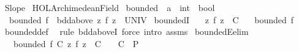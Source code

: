 %
\begin{isabellebody}%
%
%
\isadelimtheory
\isanewline
\isanewline
%
\endisadelimtheory
%
\isatagtheory
{}\isamarkupfalse%
\ Slope\isanewline
{}\ {\isachardoublequoteopen}HOL{\isachardot}{\kern0pt}Archimedean{\isacharunderscore}{\kern0pt}Field{\isachardoublequoteclose}\isanewline
{}%
\endisatagtheory
{\isafoldtheory}%
%
\isadelimtheory
%
\endisadelimtheory
%
\isadelimdocument
%
\endisadelimdocument
%
\isatagdocument
%
\isamarkuptrue%
%
\isamarkuptrue%
%
\endisatagdocument
{\isafolddocument}%
%
\isadelimdocument
%
\endisadelimdocument
{}\isamarkupfalse%
\ bounded\ {\isacharcolon}{\kern0pt}{\isacharcolon}{\kern0pt}\ {\isachardoublequoteopen}{\isacharparenleft}{\kern0pt}{\isacharprime}{\kern0pt}a\ {\isasymRightarrow}\ int{\isacharparenright}{\kern0pt}\ {\isasymRightarrow}\ bool{\isachardoublequoteclose}\ \isanewline
\ \ {\isachardoublequoteopen}bounded\ f\ {\isasymlongleftrightarrow}\ bdd{\isacharunderscore}{\kern0pt}above\ {\isacharparenleft}{\kern0pt}{\isacharparenleft}{\kern0pt}{\isasymlambda}z{\isachardot}{\kern0pt}\ {\isasymbar}f\ z{\isasymbar}{\isacharparenright}{\kern0pt}\ {\isacharbackquote}{\kern0pt}\ UNIV{\isacharparenright}{\kern0pt}{\isachardoublequoteclose}\isanewline
\isanewline
{}\isamarkupfalse%
\ boundedI{\isacharcolon}{\kern0pt}\isanewline
\ \ \ {\isachardoublequoteopen}{\isasymAnd}z{\isachardot}{\kern0pt}\ {\isasymbar}f\ z{\isasymbar}\ {\isasymle}\ C{\isachardoublequoteclose}\isanewline
\ \ \ {\isachardoublequoteopen}bounded\ f{\isachardoublequoteclose}\isanewline
%
\isadelimproof
\ \ %
\endisadelimproof
%
\isatagproof
{}\isamarkupfalse%
\ bounded{\isacharunderscore}{\kern0pt}def\ \isamarkupfalse%
\ {\isacharparenleft}{\kern0pt}rule\ bdd{\isacharunderscore}{\kern0pt}aboveI{}{\isacharcomma}{\kern0pt}\ force\ intro{\isacharcolon}{\kern0pt}\ assms{\isacharparenright}{\kern0pt}%
\endisatagproof
{\isafoldproof}%
%
\isadelimproof
\isanewline
%
\endisadelimproof
\isanewline
{}\isamarkupfalse%
\ boundedE{\isacharbrackleft}{\kern0pt}elim{\isacharbrackright}{\kern0pt}{\isacharcolon}{\kern0pt}\isanewline
\ \ \ {\isachardoublequoteopen}bounded\ f{\isachardoublequoteclose}\ {\isachardoublequoteopen}{\isasymexists}C{\isachardot}{\kern0pt}\ {\isacharparenleft}{\kern0pt}{\isasymforall}z{\isachardot}{\kern0pt}\ {\isasymbar}f\ z{\isasymbar}\ {\isasymle}\ C{\isacharparenright}{\kern0pt}\ {\isasymand}\ {}\ {\isasymle}\ C\ {\isasymLongrightarrow}\ P{\isachardoublequoteclose}\isanewline

\end{isabellebody}
